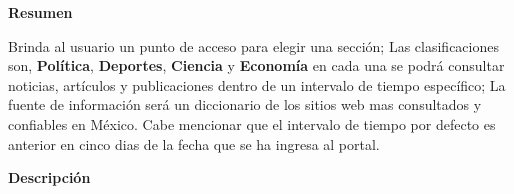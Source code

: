 
\begin{large}
	\textbf{Resumen}\\
\end{large}

Brinda al usuario un punto de acceso para elegir una sección; Las clasificaciones son, \textbf{Política}, \textbf{Deportes}, \textbf{Ciencia} y \textbf{Economía} en cada una se podrá consultar noticias, artículos y publicaciones dentro de un intervalo de tiempo específico; La fuente de información será un diccionario de los sitios web mas consultados y confiables en México. Cabe mencionar que el intervalo de tiempo por defecto es anterior en cinco dias de la fecha que se ha ingresa al portal.\\

\begin{large}
	\textbf{Descripción}\\
\end{large}


